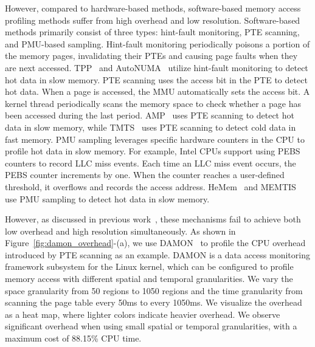 However, compared to hardware-based methods, software-based memory access profiling methods suffer from high overhead and low resolution. Software-based methods primarily consist of three types: hint-fault monitoring, PTE scanning, and PMU-based sampling.
Hint-fault monitoring periodically poisons a portion of the memory pages, invalidating their PTEs and causing page faults when they are next accessed. TPP~\cite{tpp_asplos23} and AutoNUMA~\cite{corbet2012autonuma} utilize hint-fault monitoring to detect hot data in slow memory. PTE scanning uses the access bit in the PTE to detect hot data. When a page is accessed, the MMU automatically sets the access bit. A kernel thread periodically scans the memory space to check whether a page has been accessed during the last period. AMP~\cite{amp} uses PTE scanning to detect hot data in slow memory, while TMTS~\cite{tmts_asplos2023} uses PTE scanning to detect cold data in fast memory. PMU sampling leverages specific hardware counters in the CPU to profile hot data in slow memory. For example, Intel CPUs support using PEBS counters to record LLC miss events. Each time an LLC miss event occurs, the PEBS counter increments by one. When the counter reaches a user-defined threshold, it overflows and records the access address. HeMem~\cite{hemem_sosp21} and MEMTIS~\cite{memtis_sosp23} use PMU sampling to detect hot data in slow memory.


However, as discussed in previous work~\cite{neomem}, these mechanisms fail to achieve both low overhead and high resolution simultaneously.
As shown in Figure~\ref{fig:damon_overhead}-(a), we use DAMON~\cite{damon} to profile the CPU overhead introduced by PTE scanning as an example. DAMON is a data access monitoring framework subsystem for the Linux kernel, which can be configured to profile memory access with different spatial and temporal granularities. We vary the space granularity from 50 regions to 1050 regions and the time granularity from scanning the page table every 50ms to every 1050ms. We visualize the overhead as a heat map, where lighter colors indicate heavier overhead. We observe significant overhead when using small spatial or temporal granularities, with a maximum cost of 88.15\% CPU time. 

\vspace{5pt}
\noindent{}
\vspace{5pt}


